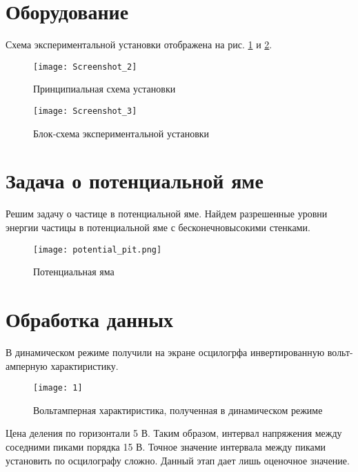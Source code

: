     \section*{Оборудование}

    Схема экспериментальной установки отображена на рис. \ref{fig:screenshot2} и \ref{fig:screenshot3}.

    \begin{figure}[tbh]
        \centering
        \texttt{[image: Screenshot\_2]}
        \caption{Принципиальная схема установки}
        \label{fig:screenshot2}
    \end{figure}

    \begin{figure}[tbh]
        \centering
        \texttt{[image: Screenshot\_3]}
        \caption{Блок-схема экспериментальной установки}
        \label{fig:screenshot3}
    \end{figure}

    \section*{Задача о потенциальной яме}

    Решим задачу о частице в потенциальной яме. Найдем разрешенные уровни энергии частицы
    в потенциальной яме с бесконечновысокими стенками.

    \begin{figure}[tbh]
        \centering
        \texttt{[image: potential\_pit.png]}
        \caption{Потенциальная яма}
        \label{fig:potential_pit}
    \end{figure}


    \section*{Обработка данных}

    В динамическом режиме получили на экране осцилогрфа инвертированную вольт-амперную характиристику.

    \begin{figure}[h]
        \centering
        \texttt{[image: 1]}
        \caption{Вольтамперная характиристика, полученная в динамическом режиме}
        \label{fig:1}
    \end{figure}

    Цена деления по горизонтали 5 В. Таким образом, интервал напряжения между соседними пиками порядка 15 В.
    Точное значение интервала между пиками установить по осцилографу сложно. Данный этап дает лишь оценочное значение.

